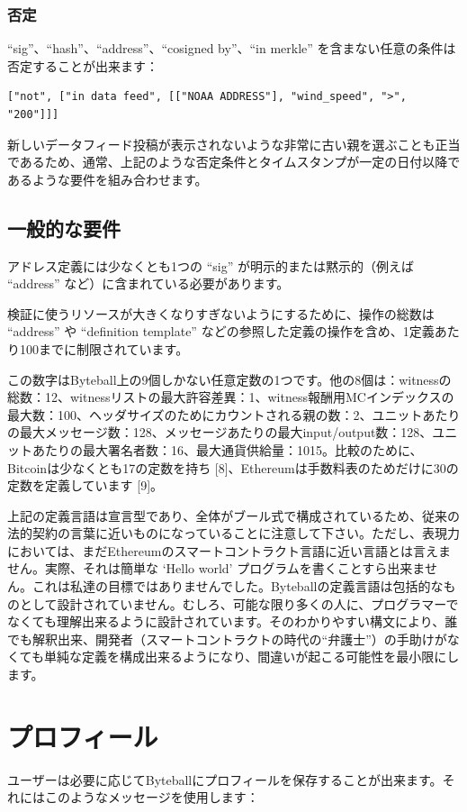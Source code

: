 \documentclass[a4paper, dvipdfmx]{jsarticle}
\begin{document}
\subsubsection{否定}
“sig”、“hash”、“address”、“cosigned by”、“in merkle” を含まない任意の条件は否定することが出来ます：

\begin{lstlisting}[basicstyle=\ttfamily\footnotesize, frame=none]
["not", ["in data feed", [["NOAA ADDRESS"], "wind_speed", ">",
"200"]]]
\end{lstlisting}

\noindent 新しいデータフィード投稿が表示されないような非常に古い親を選ぶことも正当であるため、通常、上記のような否定条件とタイムスタンプが一定の日付以降であるような要件を組み合わせます。


\subsection{一般的な要件}
アドレス定義には少なくとも1つの “sig” が明示的または黙示的（例えば “address” など）に含まれている必要があります。

検証に使うリソースが大きくなりすぎないようにするために、操作の総数は “address” や “definition template” などの参照した定義の操作を含め、1定義あたり100までに制限されています。

この数字はByteball上の9個しかない任意定数の1つです。他の8個は：witnessの総数：12、witnessリストの最大許容差異：1、witness報酬用MCインデックスの最大数：100、ヘッダサイズのためにカウントされる親の数：2、ユニットあたりの最大メッセージ数：128、メッセージあたりの最大input/output数：128、ユニットあたりの最大署名者数：16、最大通貨供給量：1015。比較のために、Bitcoinは少なくとも17の定数を持ち [8]、Ethereumは手数料表のためだけに30の定数を定義しています [9]。

上記の定義言語は宣言型であり、全体がブール式で構成されているため、従来の法的契約の言葉に近いものになっていることに注意して下さい。ただし、表現力においては、まだEthereumのスマートコントラクト言語に近い言語とは言えません。実際、それは簡単な ‘Hello world’ プログラムを書くことすら出来ません。これは私達の目標ではありませんでした。Byteballの定義言語は包括的なものとして設計されていません。むしろ、可能な限り多くの人に、プログラマーでなくても理解出来るように設計されています。そのわかりやすい構文により、誰でも解釈出来、開発者（スマートコントラクトの時代の“弁護士”）の手助けがなくても単純な定義を構成出来るようになり、間違いが起こる可能性を最小限にします。


\section{プロフィール}
ユーザーは必要に応じてByteballにプロフィールを保存することが出来ます。それにはこのようなメッセージを使用します：
\end{document}
